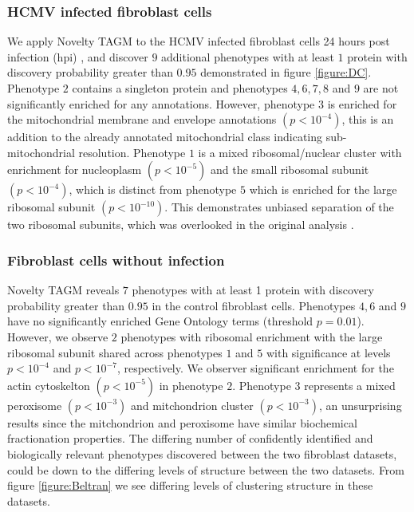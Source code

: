 \documentclass[12pt,english]{article}
\begin{document}
\subsubsection{HCMV infected fibroblast cells} 
We apply Novelty TAGM to the HCMV infected fibroblast cells 24 hours post infection (hpi) \citep{Jean_Beltran:2016}, and discover $9$ additional phenotypes with at least $1$ protein with discovery probability greater than $0.95$ demonstrated in figure \ref{figure:DC}. Phenotype $2$ contains a singleton protein and phenotypes $4,6,7,8$ and $9$ are not significantly enriched for any annotations. However, phenotype $3$ is enriched for the mitochondrial membrane and envelope annotations $(p < 10^{-4})$, this is an addition to the already annotated mitochondrial class indicating sub-mitochondrial resolution. Phenotype $1$ is a mixed ribosomal/nuclear cluster with enrichment for nucleoplasm $(p < 10^{-5})$ and the small ribosomal subunit $(p < 10^{-4})$, which is distinct from phenotype $5$ which is enriched for the large ribosomal subunit $(p < 10^{-10})$. This demonstrates unbiased separation of the two ribosomal subunits, which was overlooked in the original analysis \citep{Jean_Beltran:2016}.

\subsubsection{Fibroblast cells without infection} 
Novelty TAGM reveals $7$ phenotypes with at least 1 protein with discovery probability greater than $0.95$ in the control fibroblast cells. Phenotypes $4,6$ and $9$ have no significantly enriched Gene Ontology terms (threshold $p = 0.01$). However, we observe $2$ phenotypes with ribosomal enrichment with the large ribosomal subunit shared across phenotypes $1$ and $5$ with significance at levels $p < 10^{-4}$ and $p < 10^{-7} $, respectively. We observer significant enrichment for the actin cytoskelton $(p < 10^{-5})$ in phenotype $2$. Phenotype $3$ represents a mixed peroxisome $(p < 10^{-3})$ and mitchondrion cluster $(p < 10 ^{-3})$, an unsurprising results since the mitchondrion and peroxisome have similar biochemical fractionation properties. The differing number of confidently identified and biologically relevant phenotypes discovered between the two fibroblast datasets, could be down to the differing levels of structure between the two datasets. From figure \ref{figure:Beltran} we see differing levels of clustering structure in these datasets.
\end{document}
